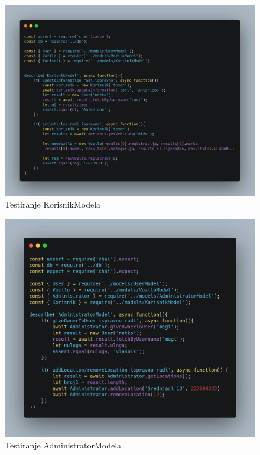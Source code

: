 	
			
			\begin{figure}[hp]
                    \centering
                    \includegraphics[width=15cm]{slike/KorisnikModel.png}
                    \caption{Testiranje KorisnikModela}
                    \label{fig:useCase-2}
                \end{figure}
			\eject 
			
			\begin{figure}[hp]
                    \centering
                    \includegraphics[width=15cm]{slike/AdministratorModel.png}
                    \caption{Testiranje AdministratorModela}
                    \label{fig:useCase-2}
                \end{figure}
			\eject 
			
